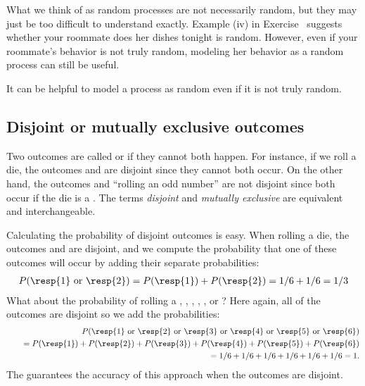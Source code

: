 What we think of as random processes are not necessarily random, but they may just be too difficult to understand exactly. Example (iv) in Exercise~ suggests whether your roommate does her dishes tonight is random. However, even if your roommate's behavior is not truly random, modeling her behavior as a random process can still be useful. 

\begin{tipBox}{
It can be helpful to model a process as random even if it is not truly random.}
\end{tipBox}

\subsection{Disjoint or mutually exclusive outcomes}

Two outcomes are called  or  if they cannot both happen. For instance, if we roll a die, the outcomes  and  are disjoint since they cannot both occur. On the other hand, the outcomes  and ``rolling an odd number'' are not disjoint since both occur if the die is a . The terms \emph{disjoint} and \emph{mutually exclusive} are equivalent and interchangeable.

Calculating the probability of disjoint outcomes is easy. When rolling a die, the outcomes  and  are disjoint, and we compute the probability that one of these outcomes will occur by adding their separate probabilities:
\begin{eqnarray*}
P(\text{\resp{1} or \resp{2}}) = P(\text{\resp{1}})+P(\text{\resp{2}}) = 1/6 + 1/6 = 1/3
\end{eqnarray*}
What about  the probability of rolling a , , , , , or ? Here again, all of the outcomes are disjoint so we add the probabilities:
\begin{eqnarray*}
&&P(\text{\resp{1} or \resp{2} or \resp{3} or \resp{4} or \resp{5} or \resp{6}}) \\
	&&\quad= P(\text{\resp{1}})+P(\text{\resp{2}})+P(\text{\resp{3}})+P(\text{\resp{4}})+P(\text{\resp{5}})+P(\text{\resp{6}}) \\
	&&\quad= 1/6 + 1/6 + 1/6 + 1/6 + 1/6 + 1/6 = 1.
\end{eqnarray*}
The  guarantees the accuracy of this approach when the outcomes are disjoint. 

